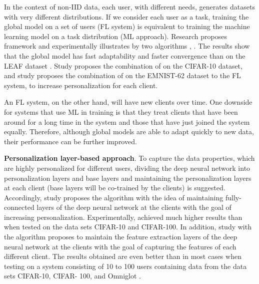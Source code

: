 \documentclass[runningheads]{llncs}
\begin{document}
In the context of non-IID data, each user, with different needs, generates datasets with very different distributions. If we consider each user as a task, training the global model on a set of users (FL system) is equivalent to training the machine learning model on a task distribution (ML approach). Research \cite{chen2018federated} proposes framework  and experimentally illustrates by two algorithms , . The results show that the global model has fast adaptability and faster convergence than  on the LEAF dataset \cite{caldas2018leaf}. Study \cite{fallah2020personalized} proposes the combination of  on the CIFAR-10 dataset, and study \cite{jiang2019improving} proposes the combination of  \cite{nichol2018first} on the EMNIST-62 dataset \cite{cohen2017emnist} to the FL system, to increase personalization for each client.

An FL system, on the other hand, will have new clients over time. One downside for systems that use ML in training is that they treat clients that have been around for a long time in the system and those that have just joined the system equally. Therefore, although global models are able to adapt quickly to new data, their performance can be further improved.

\textbf{Personalization layer-based approach}. To capture the data properties, which are highly personalized for different users, dividing the deep neural network into personalization layers and base layers and maintaining the personalization layers at each client (base layers will be co-trained by the clients) is suggested. Accordingly, study \cite{arivazhagan2019federated} proposes the  algorithm with the idea of maintaining fully-connected layers of the deep neural network at the clients with the goal of increasing personalization. Experimentally,  achieved much higher results than  when tested on the data sets CIFAR-10 and CIFAR-100. In addition, study \cite{liang2020think} with the algorithm  proposes to maintain the feature extraction layers of the deep neural network at the clients with the goal of capturing the features of each different client. The results obtained are even better than  in most cases when testing on a system consisting of 10 to 100 users containing data from the data sets CIFAR-10, CIFAR- 100, and Omniglot \cite{lake2015human}.
\end{document}
